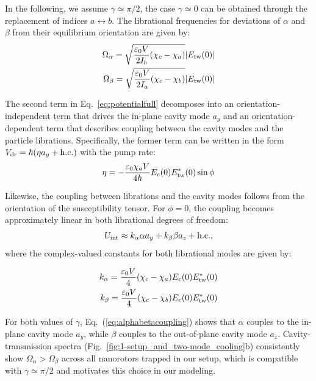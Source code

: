 \documentclass[reprint, amsmath, amssymb, superscriptaddress,showkeys,aps,pra]{revtex4-2}
\begin{document}
In the following, we assume $\gamma \simeq \pi/2$, the case $\gamma \simeq 0$ can be obtained through the replacement of indices $a\leftrightarrow b$. The librational frequencies for deviations of $\alpha$ and $\beta$ from their equilibrium orientation are given by:
\begin{align}\label{eq:librationalfrequencies}
\begin{split}
    \Omega_\alpha=\sqrt{\frac{\varepsilon_0V}{2I_b}(\chi_c-\chi_a)}|E_{\rm tw}(0)|\\ \Omega_\beta=\sqrt{\frac{\varepsilon_0V}{2I_a}(\chi_c-\chi_b)}|E_{\rm tw}(0)|
\end{split}
\end{align}

The second term in Eq.~\eqref{eq:potentialfull} decomposes into an orientation-independent term that drives the in-plane cavity mode $a_y$ and an orientation-dependent term that describes coupling between the cavity modes and the particle librations. Specifically, the former term can be written in the form $V_{\rm dr} = \hbar (\eta a_y + {\rm h.c.})$ with the pump rate:
\begin{equation}
    \eta = -\frac{\varepsilon_0 \chi_a V}{4 \hbar} E_{\rm c}(0) E_{\rm tw}^*(0) \sin \phi
\end{equation}

Likewise, the coupling between librations and the cavity modes follows from the orientation of the susceptibility tensor.
For $\phi = 0$, the coupling becomes approximately linear in both librational degrees of freedom:
\begin{equation}\label{eq:alphabetacoupling}
    U_\text{int}\approx k_\alpha\alpha a_y+k_\beta\beta a_z+{\rm h.c.},
\end{equation}
where the complex-valued constants for both librational modes are given by:

\begin{align}\label{eq:librationalkonstant}
\begin{split}
    k_\alpha = \frac{\varepsilon_0 V}{4} (\chi_c-\chi_a) E_c(0) E^*_{\rm tw}(0)\\
    k_\beta= \frac{\varepsilon_0 V}{4} (\chi_c-\chi_b) E_c(0) E^*_{\rm tw}(0)
\end{split}
\end{align}

For both values of $\gamma$, Eq.~(\ref{eq:alphabetacoupling}) shows that $\alpha$ couples to the in-plane cavity mode $a_y$, while $\beta$ couples to the out-of-plane cavity mode $a_z$. Cavity-transmission spectra (Fig.~\ref{fig:1-setup_and_two-mode_cooling}b) consistently show $\Omega_\alpha > \Omega_\beta$ across all nanorotors trapped in our setup, which is compatible with $\gamma \simeq \pi/2$ and motivates this choice in our modeling.
\end{document}
